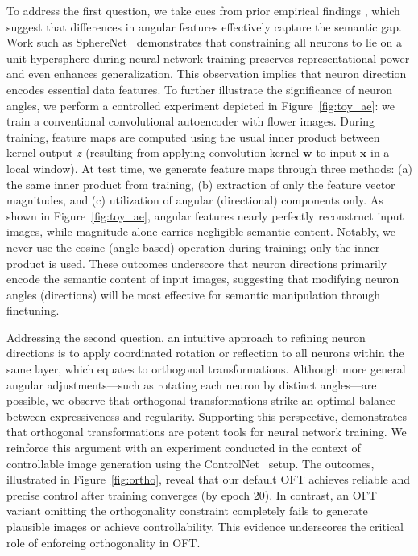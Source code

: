 To address the first question, we take cues from prior empirical findings \cite{liu2018decoupled,chen2020angular}, which suggest that differences in angular features effectively capture the semantic gap. Work such as SphereNet~\cite{liu2017deep} demonstrates that constraining all neurons to lie on a unit hypersphere during neural network training preserves representational power and even enhances generalization. This observation implies that neuron direction encodes essential data features. To further illustrate the significance of neuron angles, we perform a controlled experiment depicted in Figure~\ref{fig:toy_ae}: we train a conventional convolutional autoencoder with flower images. During training, feature maps are computed using the usual inner product between kernel output $z$ (resulting from applying convolution kernel $\bm{w}$ to input $\bm{x}$ in a local window). At test time, we generate feature maps through three methods: (a) the same inner product from training, (b) extraction of only the feature vector magnitudes, and (c) utilization of angular (directional) components only. As shown in Figure~\ref{fig:toy_ae}, angular features nearly perfectly reconstruct input images, while magnitude alone carries negligible semantic content. Notably, we never use the cosine (angle-based) operation during training; only the inner product is used. These outcomes underscore that neuron directions primarily encode the semantic content of input images, suggesting that modifying neuron angles (directions) will be most effective for semantic manipulation through finetuning.

Addressing the second question, an intuitive approach to refining neuron directions is to apply coordinated rotation or reflection to all neurons within the same layer, which equates to orthogonal transformations. Although more general angular adjustments—such as rotating each neuron by distinct angles—are possible, we observe that orthogonal transformations strike an optimal balance between expressiveness and regularity. Supporting this perspective, \cite{liu2021orthogonal} demonstrates that orthogonal transformations are potent tools for neural network training. We reinforce this argument with an experiment conducted in the context of controllable image generation using the ControlNet~\cite{zhang2023adding} setup. The outcomes, illustrated in Figure~\ref{fig:ortho}, reveal that our default OFT achieves reliable and precise control after training converges (by epoch 20). In contrast, an OFT variant omitting the orthogonality constraint completely fails to generate plausible images or achieve controllability. This evidence underscores the critical role of enforcing orthogonality in OFT.

